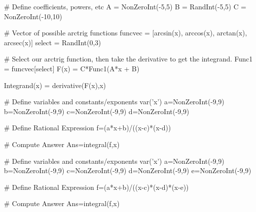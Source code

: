 \begin{sagesilent}
# Define coefficients, powers, etc
A = NonZeroInt(-5,5)
B = RandInt(-5,5)
C = NonZeroInt(-10,10)


# Vector of possible arctrig functions
funcvec = [arcsin(x), arccos(x), arctan(x), arcsec(x)]
select = RandInt(0,3)

# Select our arctrig function, then take the derivative to get the integrand.
Func1 = funcvec[select]
F(x) = C*Func1(A*x + B)

Integrand(x) = derivative(F(x),x)
\end{sagesilent}


\begin{sagesilent}
# Define variables and constants/exponents
var('x')
a=NonZeroInt(-9,9)
b=NonZeroInt(-9,9)
c=NonZeroInt(-9,9)
d=NonZeroInt(-9,9)


# Define Rational Expression
f=(a*x+b)/((x-c)*(x-d))

# Compute Answer
Ans=integral(f,x)
\end{sagesilent}



\begin{sagesilent}
# Define variables and constants/exponents
var('x')
a=NonZeroInt(-9,9)
b=NonZeroInt(-9,9)
c=NonZeroInt(-9,9)
d=NonZeroInt(-9,9)
e=NonZeroInt(-9,9)


# Define Rational Expression
f=(a*x+b)/((x-c)*(x-d)*(x-e))

# Compute Answer
Ans=integral(f,x)
\end{sagesilent}

